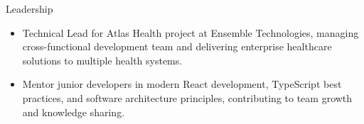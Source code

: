 \documentclass{resume} %
\begin{document}
\begin{rSection}{Leadership} 
\begin{itemize}
    \item Technical Lead for Atlas Health project at Ensemble Technologies, managing cross-functional development team and delivering enterprise healthcare solutions to multiple health systems.
    \item Mentor junior developers in modern React development, TypeScript best practices, and software architecture principles, contributing to team growth and knowledge sharing.
\end{itemize}


\end{rSection}
\end{document}
